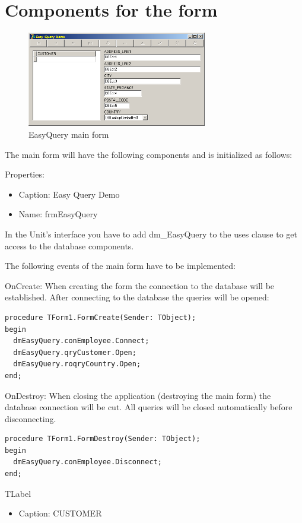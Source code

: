 \documentclass[a4paper,12pt,oneside]{book}
\begin{document}
\section{Components for the form}
\begin{figure}[htbp] 
  \centering
  \includegraphics[width=0.7\textwidth]{ZeosTutorial/frmEasyQuery.png}
  \caption{EasyQuery main form}
  \label{fig:frmEasyQuery}
\end{figure}

The main form will have the following components and is initialized as follows:

Properties:
\begin{itemize}
  \item Caption: Easy Query Demo
  \item Name: frmEasyQuery
\end{itemize}

In the Unit's interface you have to add dm\_EasyQuery to the uses clause to get access to the database components.

The following events of the main form have to be implemented:

OnCreate:
When creating the form the connection to the database will be established.
After connecting to the database the queries will be opened:
\begin{verbatim}
procedure TForm1.FormCreate(Sender: TObject);
begin
  dmEasyQuery.conEmployee.Connect;
  dmEasyQuery.qryCustomer.Open;
  dmEasyQuery.roqryCountry.Open;
end;
\end{verbatim}

OnDestroy:
When closing the application (destroying the main form) the database connection will be cut.
All queries will be closed automatically before disconnecting.
\begin{verbatim}
procedure TForm1.FormDestroy(Sender: TObject);
begin
  dmEasyQuery.conEmployee.Disconnect;
end;
\end{verbatim}

TLabel
\begin{itemize}
  \item Caption: CUSTOMER
\end{itemize}
\end{document}
